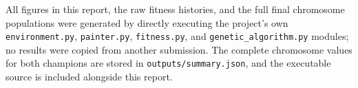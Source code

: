 \documentclass[12pt,a4paper]{article}
\begin{document}
All figures in this report, the raw fitness histories, and the full final chromosome populations were generated by directly executing the project's own \texttt{environment.py}, \texttt{painter.py}, \texttt{fitness.py}, and \texttt{genetic\_algorithm.py} modules; no results were copied from another submission. The complete chromosome values for both champions are stored in \texttt{outputs/summary.json}, and the executable source is included alongside this report.
\end{document}
